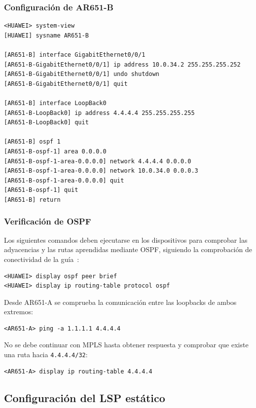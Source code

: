 \subsubsection{Configuración de AR651-B}

\begin{lstlisting}[style=terminal]
<HUAWEI> system-view
[HUAWEI] sysname AR651-B

[AR651-B] interface GigabitEthernet0/0/1
[AR651-B-GigabitEthernet0/0/1] ip address 10.0.34.2 255.255.255.252
[AR651-B-GigabitEthernet0/0/1] undo shutdown
[AR651-B-GigabitEthernet0/0/1] quit

[AR651-B] interface LoopBack0
[AR651-B-LoopBack0] ip address 4.4.4.4 255.255.255.255
[AR651-B-LoopBack0] quit

[AR651-B] ospf 1
[AR651-B-ospf-1] area 0.0.0.0
[AR651-B-ospf-1-area-0.0.0.0] network 4.4.4.4 0.0.0.0
[AR651-B-ospf-1-area-0.0.0.0] network 10.0.34.0 0.0.0.3
[AR651-B-ospf-1-area-0.0.0.0] quit
[AR651-B-ospf-1] quit
[AR651-B] return
\end{lstlisting}

\subsubsection{Verificación de OSPF}

Los siguientes comandos deben ejecutarse en los dispositivos para comprobar
las adyacencias y las rutas aprendidas mediante OSPF, siguiendo la comprobación de conectividad de la guía~\cite[tarea~1.3]{guia-mpls-ar651-s6730h}:

\begin{lstlisting}[style=terminal]
<HUAWEI> display ospf peer brief
<HUAWEI> display ip routing-table protocol ospf
\end{lstlisting}

Desde AR651-A se comprueba la comunicación entre las loopbacks de ambos
extremos:

\begin{lstlisting}[style=terminal]
<AR651-A> ping -a 1.1.1.1 4.4.4.4
\end{lstlisting}

No se debe continuar con MPLS hasta obtener respuesta y comprobar que existe
una ruta hacia \texttt{4.4.4.4/32}:

\begin{lstlisting}[style=terminal]
<AR651-A> display ip routing-table 4.4.4.4
\end{lstlisting}

\subsection{Configuración del LSP estático}

